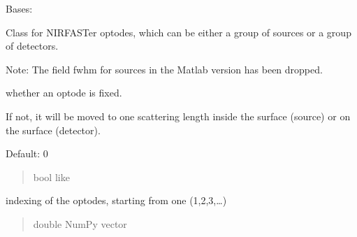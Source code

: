 \documentclass[letterpaper,10pt,english]{sphinxmanual}
\begin{document}
\begin{fulllineitems}
\label{\detokenize{_autosummary/nirfasterff.base.optodes.optode:nirfasterff.base.optodes.optode}}
\pysigstartsignatures
\pysiglinewithargsret
{}
{}
{}
\pysigstopsignatures
\sphinxAtStartPar
Bases: 

\sphinxAtStartPar
Class for NIRFASTer optodes, which can be either a group of sources or a group of detectors.

\sphinxAtStartPar
Note: The field fwhm for sources in the Matlab version has been dropped.

\begin{fulllineitems}
\label{\detokenize{_autosummary/nirfasterff.base.optodes.optode:nirfasterff.base.optodes.optode.fixed}}
\pysigstartsignatures
\pysigline
{}
\pysigstopsignatures
\sphinxAtStartPar
whether an optode is fixed.

\sphinxAtStartPar
If not, it will be moved to one scattering length inside the surface (source) or on the surface (detector).

\sphinxAtStartPar
Default: 0
\begin{quote}\begin{description}
\sphinxAtStartPar
bool like

\end{description}\end{quote}

\end{fulllineitems}


\begin{fulllineitems}
\label{\detokenize{_autosummary/nirfasterff.base.optodes.optode:nirfasterff.base.optodes.optode.num}}
\pysigstartsignatures
\pysigline
{}
\pysigstopsignatures
\sphinxAtStartPar
indexing of the optodes, starting from one (1,2,3,…)
\begin{quote}\begin{description}
\sphinxAtStartPar
double NumPy vector


\end{description}
\end{quote}
\end{fulllineitems}
\end{fulllineitems}
\end{document}
